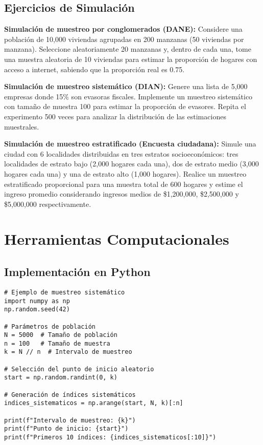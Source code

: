 \subsection{Ejercicios de Simulación}

\begin{example}
\textbf{Simulación de muestreo por conglomerados (DANE):} Considere una población de 10,000 viviendas agrupadas en 200 manzanas (50 viviendas por manzana). Seleccione aleatoriamente 20 manzanas y, dentro de cada una, tome una muestra aleatoria de 10 viviendas para estimar la proporción de hogares con acceso a internet, sabiendo que la proporción real es 0.75.
\end{example}

\begin{example}
\textbf{Simulación de muestreo sistemático (DIAN):} Genere una lista de 5,000 empresas donde 15\% son evasoras fiscales. Implemente un muestreo sistemático con tamaño de muestra 100 para estimar la proporción de evasores. Repita el experimento 500 veces para analizar la distribución de las estimaciones muestrales.
\end{example}

\begin{example}
\textbf{Simulación de muestreo estratificado (Encuesta ciudadana):} Simule una ciudad con 6 localidades distribuidas en tres estratos socioeconómicos: tres localidades de estrato bajo (2,000 hogares cada una), dos de estrato medio (3,000 hogares cada una) y una de estrato alto (1,000 hogares). Realice un muestreo estratificado proporcional para una muestra total de 600 hogares y estime el ingreso promedio considerando ingresos medios de \$1,200,000, \$2,500,000 y \$5,000,000 respectivamente.
\end{example}

\section{Herramientas Computacionales}

\subsection{Implementación en Python}

\begin{verbatim}
# Ejemplo de muestreo sistemático
import numpy as np
np.random.seed(42)

# Parámetros de población
N = 5000  # Tamaño de población
n = 100   # Tamaño de muestra
k = N // n  # Intervalo de muestreo

# Selección del punto de inicio aleatorio
start = np.random.randint(0, k)

# Generación de índices sistemáticos
indices_sistematicos = np.arange(start, N, k)[:n]

print(f"Intervalo de muestreo: {k}")
print(f"Punto de inicio: {start}")
print(f"Primeros 10 índices: {indices_sistematicos[:10]}")
\end{verbatim}


